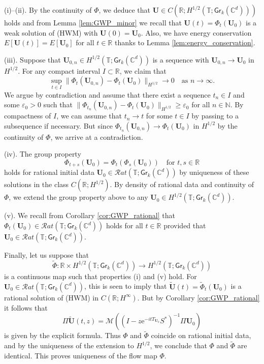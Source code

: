 \documentclass[10pt,reqno,a4paper]{amsart}
\theoremstyle{definition}
\theoremstyle{remark}
\theoremstyle{remark}
\numberwithin{equation}{section}
\newcommand{\C}{\mathbb{C}}
\newcommand{\N}{\mathbb{N}}
\newcommand{\R}{\mathbb{R}}
\newcommand{\T}{\mathbb{T}}
\newcommand{\Mean}{\mathscr{M}}
\newcommand{\eps}{\varepsilon}
\newcommand{\eu}{\mathrm{e}}
\newcommand{\Ub}{\mathbf{U}}
\newcommand{\id}{I}
\newcommand{\Gr}{\mathsf{Gr}}
\begin{document}
\medskip
(i)--(ii).  By the continuity of $\Phi$, we deduce that $\Ub \in C(\R; H^{1/2}(\T; \Gr_k(\C^d)))$ holds and from Lemma \ref{lem:GWP_minor} we recall that $\Ub(t) = \Phi_t(\Ub_0)$ is a weak solution of (HWM) with $\Ub(0) = \Ub_0$.  Also, we have energy conservation $E[\Ub(t)] = E[\Ub_0]$ for all $t \in \R$ thanks to Lemma \ref{lem:energy_conservation}.

\medskip
(iii).  Suppose that $\Ub_{0,n} \in H^{1/2}(\T; \Gr_k(\C^d))$ is a sequence with $\Ub_{0,n} \to \Ub_0$ in $H^{1/2}$. For any compact interval $I \subset \R$, we claim that
$$
\sup_{t \in I} \| \Phi_{t}(\Ub_{0,n}) - \Phi_t(\Ub_0) \|_{H^{1/2}} \to 0 \quad \mbox{as $n \to \infty$}.
$$
We argue by contradiction and assume that there exist a sequence $t_n \in I$ and some $\eps_0 > 0$ such that $\| \Phi_{t_n}(\Ub_{0,n}) - \Phi_t(\Ub_0) \|_{H^{1/2}} \geq \eps_0$ for all $n \in \N$. By compactness of $I$, we can assume that $t_n \to t$ for some $t \in I$ by passing to a subsequence if necessary. But since $\Phi_{t_n}(\Ub_{0,n}) \to \Phi_{t}(\Ub_0)$ in $H^{1/2}$ by the continuity of $\Phi$, we arrive at a contradiction.

\medskip
(iv). The group property 
$$
\Phi_{t+s}(\Ub_0) = \Phi_t (\Phi_s(\Ub_0)) \quad \mbox{for $t,s \in \R$}
$$
holds for rational initial data $\Ub_0 \in \mathcal{R}at(\T; \Gr_k(\C^d))$ by uniqueness of these solutions in the class $C(\R; H^{1/2})$. By density of rational data and continuity of $\Phi$, we extend the group property above to any $\Ub_0 \in H^{1/2}(\T; \Gr_k(\C^d))$.

\medskip
(v). We recall from Corollary \ref{cor:GWP_rational} that $\Phi_t(\Ub_0) \in \mathcal{R}at(\T; \Gr_k(\C^d))$ holds for all $t \in \R$ provided that $\Ub_0 \in \mathcal{R}at(\T; \Gr_k(\C^d))$. 

\medskip
Finally, let us suppose that 
$$
\widetilde{\Phi} : \R \times H^{1/2}(\T; \Gr_k(\C^d)) \to H^{1/2}(\T; \Gr_k(\C^d))
$$
is a continuous map such that properties (i) and (v) hold. For $\Ub_0 \in \mathcal{R}at(\T; \Gr_k(\C^d))$, this is seen to imply that $\widetilde{\Ub}(t) = \widetilde{\Phi}_t(\Ub_0)$ is a rational solution of (HWM) in $C(\R; H^\infty)$. But by Corollary \ref{cor:GWP_rational} it follows that
$$
\Pi \widetilde{\Ub}(t,z) = \Mean \left ( ( \id - z \eu^{-i t T_{\Ub_0}} S^*)^{-1} \Pi \Ub_0 \right )
$$ 
is given by the explicit formula. Thus $\Phi$ and $\widetilde{\Phi}$ coincide on rational initial data, and by the uniqueness of the extension to $H^{1/2}$, we conclude that $\Phi$ and $\widetilde{\Phi}$ are identical. This proves uniqueness of the flow map $\Phi$.
\end{document}
